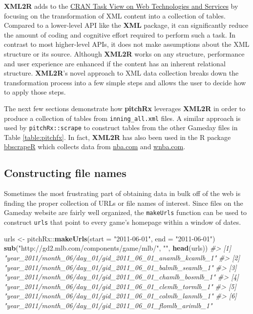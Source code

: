 \documentclass[12pt,]{isuthesis}
\newenvironment{Shaded}{\begin{snugshade}}{\end{snugshade}}
\newcommand{\KeywordTok}[1]{\textcolor[rgb]{0.13,0.29,0.53}{\textbf{{#1}}}}
\newcommand{\DataTypeTok}[1]{\textcolor[rgb]{0.13,0.29,0.53}{{#1}}}
\newcommand{\StringTok}[1]{\textcolor[rgb]{0.31,0.60,0.02}{{#1}}}
\newcommand{\CommentTok}[1]{\textcolor[rgb]{0.56,0.35,0.01}{\textit{{#1}}}}
\newcommand{\NormalTok}[1]{{#1}}
\begin{document}
\textbf{XML2R} adds to the
\href{http://cran.r-project.org/web/views/WebTechnologies.html}{CRAN Task View on Web Technologies and Services}
by focusing on the transformation of XML content into a collection of
tables. Compared to a lower-level API like the \textbf{XML} package, it
can significantly reduce the amount of coding and cognitive effort
required to perform such a task. In contrast to most higher-level APIs,
it does not make assumptions about the XML structure or its source.
Although \textbf{XML2R} works on any structure, performance and user
experience are enhanced if the content has an inherent relational
structure. \textbf{XML2R}'s novel approach to XML data collection breaks
down the transformation process into a few simple steps and allows the
user to decide how to apply those steps.

The next few sections demonstrate how \textbf{pitchRx} leverages
\textbf{XML2R} in order to produce a collection of tables from
\texttt{inning\_all.xml} files. A similar approach is used by
\texttt{pitchRx::scrape} to construct tables from the other Gameday
files in Table \ref{table:pitchfx}. In fact, \textbf{XML2R} has also
been used in the R package
\href{https://github.com/cpsievert/bbscrapeR}{bbscrapeR} which collects
data from \href{http://nba.com}{nba.com} and
\href{http://wnba.com}{wnba.com}.

\subsection{Constructing file names}\label{constructing-file-names}

Sometimes the most frustrating part of obtaining data in bulk off of the
web is finding the proper collection of URLs or file names of interest.
Since files on the Gameday website are fairly well organized, the
\texttt{makeUrls} function can be used to construct \texttt{urls} that
point to every game's homepage within a window of dates.

\begin{Shaded}
\begin{Highlighting}[]
\NormalTok{urls <-}\StringTok{ }\NormalTok{pitchRx::}\KeywordTok{makeUrls}\NormalTok{(}\DataTypeTok{start =} \StringTok{"2011-06-01"}\NormalTok{, }\DataTypeTok{end =} \StringTok{"2011-06-01"}\NormalTok{) }
\KeywordTok{sub}\NormalTok{(}\StringTok{"http://gd2.mlb.com/components/game/mlb/"}\NormalTok{, }\StringTok{""}\NormalTok{, }\KeywordTok{head}\NormalTok{(urls))}
\CommentTok{#> [1] "year_2011/month_06/day_01/gid_2011_06_01_anamlb_kcamlb_1"}
\CommentTok{#> [2] "year_2011/month_06/day_01/gid_2011_06_01_balmlb_seamlb_1"}
\CommentTok{#> [3] "year_2011/month_06/day_01/gid_2011_06_01_chamlb_bosmlb_1"}
\CommentTok{#> [4] "year_2011/month_06/day_01/gid_2011_06_01_clemlb_tormlb_1"}
\CommentTok{#> [5] "year_2011/month_06/day_01/gid_2011_06_01_colmlb_lanmlb_1"}
\CommentTok{#> [6] "year_2011/month_06/day_01/gid_2011_06_01_flomlb_arimlb_1"}
\end{Highlighting}
\end{Shaded}
\end{document}
